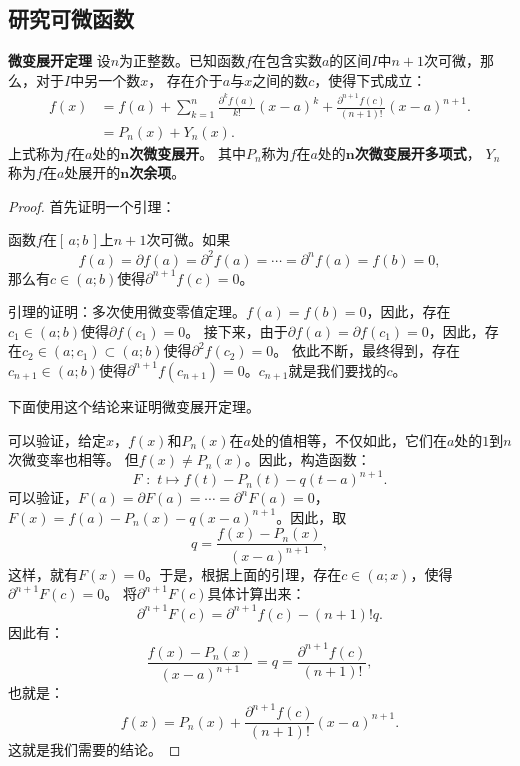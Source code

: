 \documentclass[12pt,UTF8]{ctexbook}
\begin{document}
\begin{appendix}
\section{研究可微函数}

\begin{tm}{\textbf{微变展开定理}}
    设$n$为正整数。已知函数$f$在包含实数$a$的区间$I$中$n+1$次可微，那么，对于$I$中另一个数$x$，
    存在介于$a$与$x$之间的数$c$，使得下式成立：
    \begin{align*}
        f(x) &= f(a) + \sum_{k=1}^n \frac{\partial^k f (a)}{k!}(x - a)^k + \frac{\partial^{n+1} f (c)}{(n+1)!}(x - a)^{n+1}.  \\
        &= P_n(x) + Y_n(x). 
    \end{align*}
    上式称为$f$在$a$处的$\boldsymbol{n}$\textbf{次微变展开}。
    其中$P_n$称为$f$在$a$处的$\boldsymbol{n}$\textbf{次微变展开多项式}，
    $Y_n$称为$f$在$a$处展开的$\boldsymbol{n}$\textbf{次余项}。
    
\end{tm}

\begin{proof}
    首先证明一个引理：

    函数$f$在$[\,a; b\,]$上$n+1$次可微。如果
    $$f(a) = \partial f(a) = \partial^2 f(a) = \cdots = \partial^{n} f(a) = f(b) = 0,$$
    那么有$c\in(a; b)$使得$\partial^{n+1} f(c) = 0$。

    引理的证明：多次使用微变零值定理。$f(a) = f(b) = 0$，因此，存在$c_1\in(a; b)$使得$\partial f (c_1) = 0$。
    接下来，由于$\partial f(a) = \partial f(c_1) = 0$，因此，存在$c_2\in(a; c_1)\subset(a; b)$使得$\partial^2 f (c_2) = 0$。
    依此不断，最终得到，存在$c_{n+1}\in(a; b)$使得$\partial^{n+1} f (c_{n+1}) = 0$。$c_{n+1}$就是我们要找的$c$。

    下面使用这个结论来证明微变展开定理。

    可以验证，给定$x$，$f(x)$和$P_n(x)$在$a$处的值相等，不仅如此，它们在$a$处的$1$到$n$次微变率也相等。
    但$f(x) \neq P_n(x)$。因此，构造函数：
    $$ F\,\,: \,\, t \mapsto f(t) - P_n(t) - q(t - a)^{n+1}. $$
    可以验证，$F(a) = \partial F(a) = \cdots = \partial^n F(a) = 0$，
    $F(x) = f(a) - P_n(x) - q(x - a)^{n+1}$。因此，取
    $$ q = \frac{f(x) - P_n(x)}{(x - a)^{n+1}}, $$
    这样，就有$F(x) = 0$。于是，根据上面的引理，存在$c\in(a; x)$，使得$\partial^{n+1} F(c) = 0$。
    将$\partial^{n+1} F(c)$具体计算出来：
    $$ \partial^{n+1} F(c) = \partial^{n+1} f(c) - (n+1)! q.$$
    因此有：
    $$ \frac{f(x) - P_n(x)}{(x - a)^{n+1}} = q = \frac{\partial^{n+1} f(c)}{(n+1)!}, $$
    也就是：
    $$ f(x) = P_n(x) + \frac{\partial^{n+1} f(c)}{(n+1)!} (x - a)^{n+1}. $$
    这就是我们需要的结论。
\end{proof}


\end{appendix}
\end{document}
